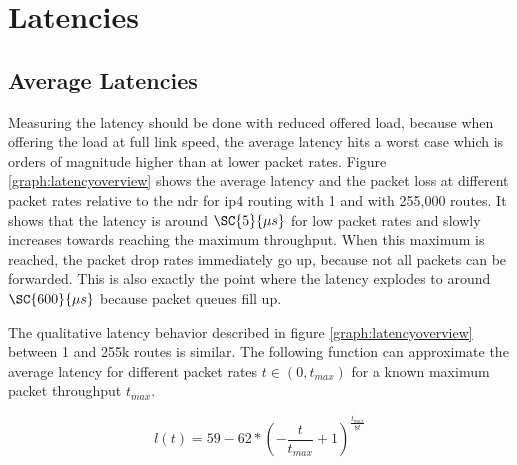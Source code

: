 

\section{Latencies}

\subsection{Average Latencies}


Measuring the latency should be done with reduced offered load,
because when offering the load at full link speed, the average latency
hits a worst case which is orders of magnitude higher than at lower
packet rates. Figure \ref{graph:latencyoverview} shows the average
latency and the packet loss at different packet rates relative to the
\Ac{ndr} for \Ac{ip4} routing with 1 and with 255,000 routes. It shows
that the latency is around $\SC{5}{\mu s}$ for low packet rates and
slowly increases towards reaching the maximum throughput. When this
maximum is reached, the packet drop rates immediately go up, because
not all packets can be forwarded. This is also exactly the point where
the latency explodes to around $\SC{600}{\mu s}$ because packet queues
fill up.

The qualitative latency behavior described in figure
\ref{graph:latencyoverview} between 1 and 255k routes is similar. The
following function can approximate the average latency for different
packet rates $t \in (0, t_{max})$ for a known maximum packet
throughput $t_{max}$. 

$$ l(t) = 59 - 62 * (-\frac{t}{t_{max}}+1)^{\frac{t_{max}}{8t}} $$ 



